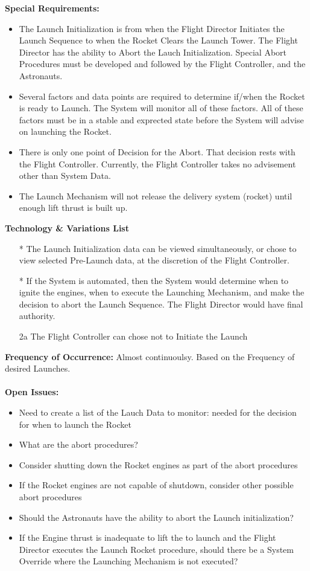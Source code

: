 \documentclass[letterpaper]{article}
\begin{document}
\textbf{Special Requirements:}
\begin{itemize}
\item The Launch Initialization is from when the Flight Director
Initiates the Launch Sequence to when the Rocket Clears the Launch
Tower.  The Flight Director has the ability to Abort the Lauch
Initialization.  Special Abort Procedures must be developed and
followed by the Flight Controller, and the Astronauts.
\item Several factors and data points are required to determine
if/when the Rocket is ready to Launch.  The System will monitor all
of these factors.  All of these factors must be in a stable and
exprected state before the System will advise on launching the Rocket.
\item There is only one point of Decision for the Abort.  That decision
rests with the Flight Controller.  Currently, the Flight Controller
takes no advisement other than System Data.
\item The Launch Mechanism will not release the delivery system
(rocket) until enough lift thrust is built up.
\end{itemize}
\textbf{Technology \& Variations List}
\begin{itemize}
\item[*] The Launch Initialization data can be viewed simultaneously,
or chose to view selected Pre-Launch data, at the discretion of the Flight
Controller.
\item[*]  If the System is automated, then the System would determine
when to ignite the engines, when  to execute the Launching
Mechanism, and make the decision to abort the Launch Sequence.  The
Flight Director would have final authority.
\item[2a]The Flight Controller can chose not to Initiate the Launch
\end{itemize}
\textbf{Frequency of Occurrence:  }Almost continuoulsy.  Based on the
Frequency of desired Launches.\\\\
\textbf{Open Issues:  }
\begin{itemize}
\item Need to create a list of the Lauch Data to monitor:  needed for
the decision for when to launch the Rocket
\item What are the abort procedures?
\item Consider shutting down the Rocket engines as part of the abort
procedures
\item If the Rocket engines are not capable of shutdown, consider
other possible abort procedures
\item Should the Astronauts have the ability to abort the Launch
initialization?
\item If the Engine thrust is inadequate to lift the to launch and
the Flight Director executes the Launch Rocket procedure, should there
be a System Override where the Launching Mechanism is not executed?
\end{itemize}
\end{document}
